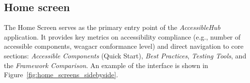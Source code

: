 \subsection{Home screen}

The Home Screen serves as the primary entry point of the \textit{AccessibleHub} application. It provides key metrics on accessibility compliance (e.g., number of accessible components, \acrshort{wcagacr} conformance level) and direct navigation to core sections: \textit{Accessible Components} (Quick Start), \textit{Best Practices}, \textit{Testing Tools}, and the \textit{Framework Comparison}. An example of the interface is shown in Figure~\ref{fig:home_screens_sidebyside}.

\begin{figure}[ht]
    \centering
    \begin{subfigure}[b]{0.48\textwidth}
        \centering

\end{subfigure}
\end{figure}
